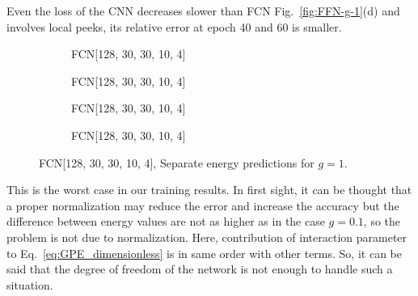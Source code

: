 \documentclass[a4paper,times,12pt]{article}
\begin{document}
Even the loss of the CNN decreases slower than FCN Fig.~\ref{fig:FFN-g-1}(d) and involves local peeks, its relative error at epoch 40 and 60 is smaller. 

\begin{figure}[H]
    \centering
    \begin{subfigure}[t]{0.45\textwidth}
		\centering
        
        \caption{FCN[128, 30, 30, 10, 4]}
		\label{fig:a}
    \end{subfigure}
    \begin{subfigure}[t]{0.45\textwidth}
		\centering
        
        \caption{FCN[128, 30, 30, 10, 4]}
		\label{fig:b}
    \end{subfigure}    
    \begin{subfigure}[t]{0.45\textwidth}
        \centering
        
        \caption{FCN[128, 30, 30, 10, 4]}
		\label{fig:c}
    \end{subfigure}
    \begin{subfigure}[t]{0.45\textwidth}
        \centering
        
        \caption{FCN[128, 30, 30, 10, 4]}
		\label{fig:c}
    \end{subfigure}
	\caption{FCN[128, 30, 30, 10, 4], Separate energy predictions for $g = 1$.}
\label{fig:FFN-g-1-S}
\end{figure}

This is the worst case in our training results. In first sight, it can be thought that a proper normalization may reduce the error and increase the accuracy but the difference between energy values are not as higher as in the case $g = 0.1$, so the problem is not due to normalization. Here, contribution of interaction parameter to Eq.~\ref{eq:GPE_dimensionless} is in same order with other terms. So, it can be said that the degree of freedom of the network is not enough to handle such a situation.
\end{document}
